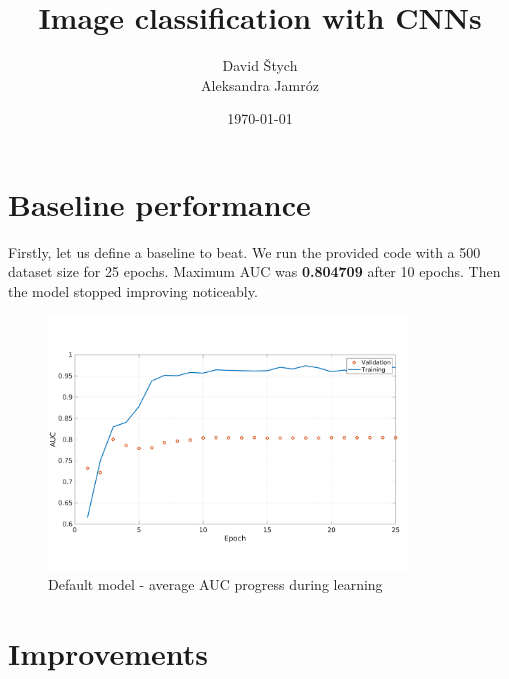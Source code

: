 \documentclass{article}
\title{Image classification with CNNs}
\author{David Štych\\ Aleksandra Jamróz}
\date{\today{}}
\begin{document}
\maketitle



\section*{Baseline performance}
Firstly, let us define a baseline to beat. We run the provided code with a 500 dataset size for 25 epochs. Maximum AUC was \textbf{0.804709} after 10 epochs. Then the model stopped improving noticeably.
\begin{figure}[H]
\centering
\includegraphics[width=0.85\textwidth]{figures/default_AUC_progress.pdf}
\caption{Default model - average AUC progress during learning}
\end{figure}


\section*{Improvements}
\end{document}

